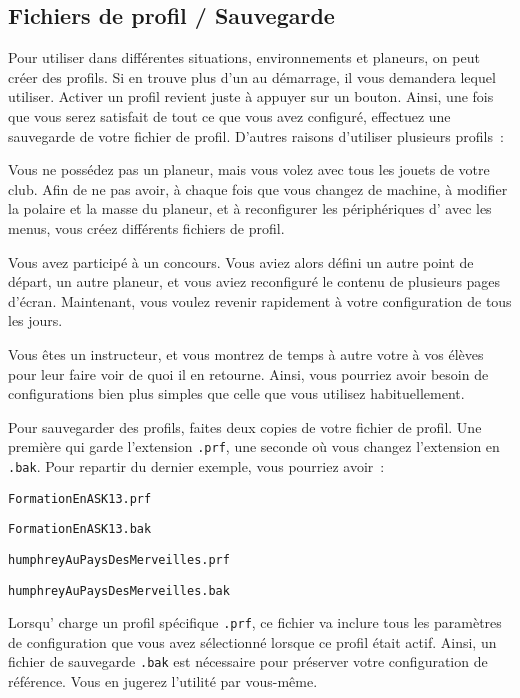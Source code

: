 \documentclass[french, a4paper, 12pt]{refrep}
\begin{document}
\subsection{\textcolor{flashblue}{Fichiers de profil / Sauvegarde}}
Pour utiliser \xc{} dans différentes situations, environnements et planeurs, on peut 
créer des profils. Si \xc{} en trouve plus d'un au démarrage,
il vous demandera lequel utiliser. Activer un profil revient juste
à appuyer sur un bouton.
Ainsi, une fois que vous serez satisfait de tout ce que vous avez configuré, effectuez une sauvegarde de votre
fichier de profil. D'autres raisons d'utiliser plusieurs profils~: 
\begin{compactitem}
\item Vous ne possédez pas un planeur, mais vous volez avec tous les jouets de votre club. Afin de 
ne pas avoir, à chaque fois que vous changez de machine, à modifier la polaire et la masse du planeur,
et à reconfigurer les périphériques d'\xc{} avec les menus,
vous créez différents fichiers de profil.
\item Vous avez participé à un concours. Vous aviez alors défini un autre point de départ, un autre planeur, et
vous aviez reconfiguré le contenu de plusieurs pages d'écran. Maintenant, vous voulez revenir rapidement à
votre configuration de tous les jours.
\item Vous êtes un instructeur, et vous montrez de temps à autre votre \xc{} 
à vos élèves pour leur faire voir de quoi il en retourne. Ainsi, vous pourriez
avoir besoin de configurations bien plus simples que celle que vous utilisez habituellement.
\end{compactitem}
Pour sauvegarder des profils, faites deux copies de votre fichier de profil. 
Une première qui garde l'extension \verb+.prf+, une seconde où vous changez l'extension en
\verb+.bak+.
Pour repartir du dernier exemple, vous pourriez avoir~:
\begin{compactitem}
\item\verb+FormationEnASK13.prf+
\item\verb+FormationEnASK13.bak+
\item\verb+humphreyAuPaysDesMerveilles.prf+
\item\verb+humphreyAuPaysDesMerveilles.bak+
\end{compactitem}
Lorsqu'\xc{} charge un profil spécifique \verb+.prf+, ce fichier
va inclure tous les paramètres de configuration que vous avez sélectionné lorsque ce profil était actif.
Ainsi, un fichier de sauvegarde \verb+.bak+ est nécessaire pour préserver votre configuration de référence. Vous
en jugerez l'utilité par vous-même.
\end{document}
